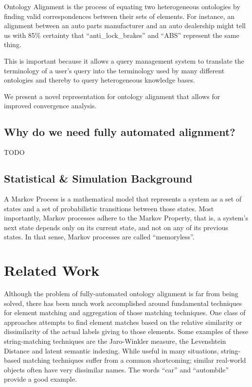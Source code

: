 \documentclass[letterpaper,twocolumn,12pt]{article}
\begin{document}
Ontology Alignment is the process of equating two heterogeneous ontologies by
finding valid correspondences between their sets of elements. 
%
For instance, an alignment between an auto parts manufacturer and an auto dealership
might tell us with 85\% certainty that ``anti\_lock\_brakes'' and ``ABS'' represent
the same thing.

This is important because it allows a query management system to translate the terminology
of a user's query into the terminology used by many different ontologies and thereby
to query heterogeneous knowledge bases.

We present a novel representation for ontology alignment that allows for improved
convergence analysis.

\subsection{Why do we need fully automated alignment?}
\label{subsec:automated}

TODO

\subsection{Statistical \& Simulation Background}
\label{subsec:stat}

A Markov Process is a mathematical model that represents a system as a set of states
and a set of probabilistic transitions between those states. Most importantly, Markov 
processes adhere to the Markov Property, that is, a system's next state depends only
on its current state, and not on any of its previous states. In that sense, Markov
processes are called ``memoryless''.


\section{Related Work}

Although the problem of fully-automated ontology alignment is far from being solved,
there has been much work accomplished around fundamental techniques for element
matching and aggregation of those matching techniques. One class of approaches
attempts to find element matches based on the relative similarity or dissimilarity
of the actual labels giving to those elements. Some examples of these string-matching 
techniques are the Jaro-Winkler measure, the Levenshtein Distance and latent semantic 
indexing.
%
While useful in many situations, string-based matching techniques suffer from a common 
shortcoming; similar real-world objects often have very dissimilar names. The words
``car'' and ``autombile'' provide a good example.
\end{document}
